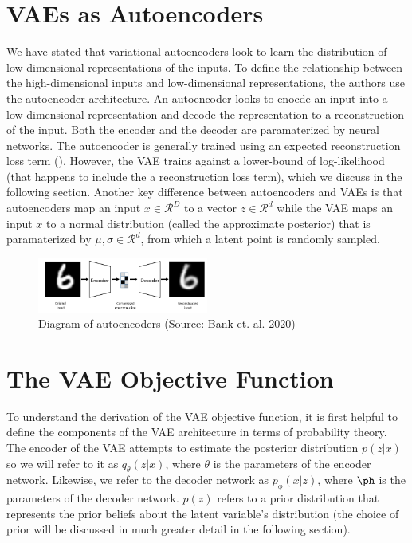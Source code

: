 \documentclass[./dissertation.tex]{subfiles}
\begin{document}
    \section{VAEs as Autoencoders}
    We have stated that variational autoencoders look to learn the distribution of low-dimensional representations of the inputs. To define the relationship between the high-dimensional inputs and low-dimensional representations, the authors use the autoencoder architecture. An autoencoder looks to enocde an input into a low-dimensional representation and decode the representation to a reconstruction of the input. Both the encoder and the decoder are paramaterized by neural networks. The autoencoder is generally trained using an expected reconstruction loss term (\cite{bank2020autoencoders}). However, the VAE trains against a lower-bound of log-likelihood (that happens to include the a reconstruction loss term), which we discuss in the following section. Another key difference between autoencoders and VAEs is that autoencoders map an input $x \in \mathcal{R}^{D}$ to a vector $z \in \mathcal{R}^{d}$ while the VAE maps an input $x$ to a normal distribution (called the approximate posterior) that is paramaterized by $\mu, \sigma \in \mathcal{R}^{d}$, from which a latent point is randomly sampled. 
    
    \begin{figure}[h]
        \centering\includegraphics[width=0.5\textwidth]{figures/autoencoder.PNG}
        \caption{Diagram of autoencoders (Source: Bank et. al. 2020)}
        \label{Autoencoder Diagram}
    \end{figure}
    
    \section{The VAE Objective Function}
    To understand the derivation of the VAE objective function, it is first helpful to define the components of the VAE architecture in terms of probability theory. The encoder of the VAE attempts to estimate the posterior distribution $p(z|x)$ so we will refer to it as $q_{\theta}(z|x)$, where $\theta$ is the parameters of the encoder network. Likewise, we refer to the decoder network as $p_{\phi}(x|z)$, where $\ph$ is the parameters of the decoder network. $p(z)$ refers to a prior distribution that represents the prior beliefs about the latent variable's distribution (the choice of prior will be discussed in much greater detail in the following section). 
    
\end{document}
